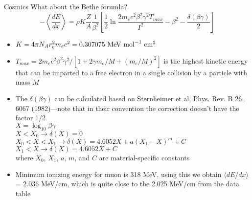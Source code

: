 \documentclass[compress,8pt]{beamer} %
\begin{document}
\begin{frame}{Cosmics}
What about the Bethe forumla?
\begin{equation*}
-\left<\frac{dE}{dx}\right> = \rho K\frac{Z}{A}\frac{1}{\beta^2}
\left[ \frac{1}{2} \ln \frac{2m_ec^2\beta^2\gamma^2T_{max}}{I^2} - \beta^2 - \frac{\delta(\beta\gamma)}{2}\right]
\end{equation*}
\begin{itemize}
\item $K = 4\pi N_A r_e^2 m_ec^2 = 0.307075~\textnormal{MeV}~\textnormal{mol}^{-1}~\textnormal{cm}^2$
\item $T_{max} = 2m_ec^2\beta^2\gamma^2/[1 + 2\gamma m_e/M + (m_e/M)^2]$
is the highest kinetic energy that can be imparted to a free electron in a single collision
by a particle with mass $M$
\item The $\delta(\beta\gamma)$ can be calculated based on Sternheimer et al, Phys. Rev. B 26, 6067
(1982)---note that in their convention the correction doesn't have the factor 1/2 \\
$X = \log_{10} \beta\gamma$ \\
$X < X_0 \rightarrow \delta(X) = 0$ \\
$X_0 < X < X_1 \rightarrow \delta(X) = 4.6052X + a(X_1-X)^m + C$ \\
$X_1 < X \rightarrow \delta(X) = 4.6052X + C$ \\
where $X_0$, $X_1$, $a$, $m$, and $C$ are material-specific constants
\item Minimum ionizing energy for muon is 318 MeV, using this we obtain $\langle dE/dx\rangle$ = 2.036 MeV/cm,
which is quite close to the 2.025 MeV/cm from the data table
\end{itemize}
\end{frame}
\end{document}
